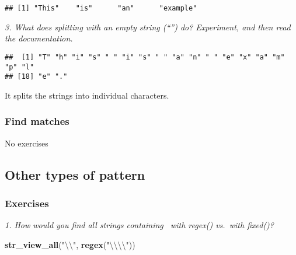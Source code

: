 \documentclass[]{article}
\newenvironment{Shaded}{\begin{snugshade}}{\end{snugshade}}
\newcommand{\KeywordTok}[1]{\textcolor[rgb]{0.13,0.29,0.53}{\textbf{#1}}}
\newcommand{\DecValTok}[1]{\textcolor[rgb]{0.00,0.00,0.81}{#1}}
\newcommand{\CharTok}[1]{\textcolor[rgb]{0.31,0.60,0.02}{#1}}
\newcommand{\StringTok}[1]{\textcolor[rgb]{0.31,0.60,0.02}{#1}}
\newcommand{\OperatorTok}[1]{\textcolor[rgb]{0.81,0.36,0.00}{\textbf{#1}}}
\newcommand{\NormalTok}[1]{#1}
\theoremstyle{definition}
\theoremstyle{definition}
\theoremstyle{definition}
\theoremstyle{remark}
\begin{document}
\begin{verbatim}
## [1] "This"    "is"      "an"      "example"
\end{verbatim}

\emph{3. What does splitting with an empty string (``'') do? Experiment,
and then read the documentation.}

\begin{Shaded}
\end{Shaded}

\begin{verbatim}
##  [1] "T" "h" "i" "s" " " "i" "s" " " "a" "n" " " "e" "x" "a" "m" "p" "l"
## [18] "e" "."
\end{verbatim}

It splits the strings into individual characters.

\subsubsection{Find matches}\label{find-matches}

No exercises

\subsection{Other types of pattern}\label{other-types-of-pattern}

\subsubsection{Exercises}\label{exercises-36}

\emph{1. How would you find all strings containing ~with regex()
vs.~with fixed()?}

\begin{Shaded}
\begin{Highlighting}[]
\KeywordTok{str_view_all}\NormalTok{(}\StringTok{"}\CharTok{\textbackslash{}\textbackslash{}}\StringTok{"}\NormalTok{, }\KeywordTok{regex}\NormalTok{(}\StringTok{"}\CharTok{\textbackslash{}\textbackslash{}\textbackslash{}\textbackslash{}}\StringTok{"}\NormalTok{))}
\end{Highlighting}
\end{Shaded}
\end{document}
